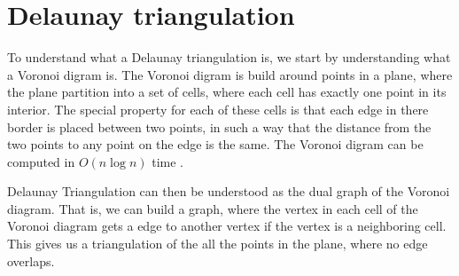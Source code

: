 \chapter{Delaunay triangulation}\label{appendix:delaunaykruskal}

To understand what a Delaunay triangulation is, we start by understanding what a 
Voronoi digram is. The Voronoi digram is build around points in a plane, where 
the plane partition into a set of cells, where each cell has exactly one point 
in its interior. The special property for each of these cells is that each edge 
in there border is placed between two points, in such a way that the distance 
from the two points to any point on the edge is the same. The Voronoi digram can 
be computed in $O(n \log n)$ time \cite{CompGeo}. 

Delaunay Triangulation can then be understood as the dual graph of the Voronoi 
diagram. That is, we can build a graph, where the vertex in each cell of the 
Voronoi diagram gets a edge to another vertex if the vertex is a neighboring 
cell. This gives us a triangulation of the all the points in the plane, where
no edge overlaps.


